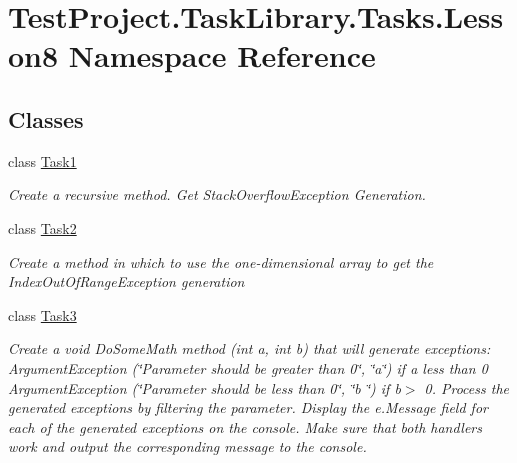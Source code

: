 \hypertarget{namespace_test_project_1_1_task_library_1_1_tasks_1_1_lesson8}{}\section{Test\+Project.\+Task\+Library.\+Tasks.\+Lesson8 Namespace Reference}
\label{namespace_test_project_1_1_task_library_1_1_tasks_1_1_lesson8}
\subsection*{Classes}
\begin{DoxyCompactItemize}
\item 
class \mbox{\hyperlink{class_test_project_1_1_task_library_1_1_tasks_1_1_lesson8_1_1_task1}{Task1}}
\begin{DoxyCompactList}\small\item\em Create a recursive method. Get Stack\+Overflow\+Exception Generation. \end{DoxyCompactList}\item 
class \mbox{\hyperlink{class_test_project_1_1_task_library_1_1_tasks_1_1_lesson8_1_1_task2}{Task2}}
\begin{DoxyCompactList}\small\item\em Create a method in which to use the one-\/dimensional array to get the Index\+Out\+Of\+Range\+Exception generation \end{DoxyCompactList}\item 
class \mbox{\hyperlink{class_test_project_1_1_task_library_1_1_tasks_1_1_lesson8_1_1_task3}{Task3}}
\begin{DoxyCompactList}\small\item\em Create a void Do\+Some\+Math method (int a, int b) that will generate exceptions\+: Argument\+Exception (\char`\"{}\+Parameter should be greater than 0\char`\"{}, \char`\"{}a\char`\"{}) if a less than 0 Argument\+Exception (\char`\"{}\+Parameter should be less than 0\char`\"{}, \char`\"{}b \char`\"{}) if b$>$ 0. Process the generated exceptions by filtering the parameter. Display the e.\+Message field for each of the generated exceptions on the console. Make sure that both handlers work and output the corresponding message to the console. \end{DoxyCompactList}\end{DoxyCompactItemize}
